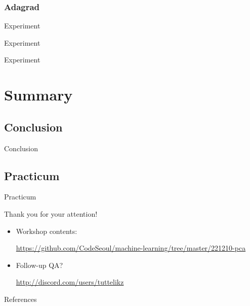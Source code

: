 \documentclass{beamer}
\begin{document}
    \begin{frame}
    \end{frame}



    \begin{frame}
      \begin{center}
      \end{center}
    \end{frame}


    \begin{frame}
      \frametitle{Adagrad}
    \end{frame}


    \nocite{*}
    \begin{frame}{Experiment}
    \end{frame}

    \begin{frame}{Experiment}
    \end{frame}

    \begin{frame}{Experiment}
    \end{frame}
    

    \section{Summary} %
    \subsection{Conclusion}
    \begin{frame}{Conclusion}

    \end{frame}


    \subsection{Practicum}
    \begin{frame}{Practicum}
      \begin{center}
      \begin{huge}Thank you for your attention!\end{huge}
      \end{center}

        \vspace{0.5cm}
        \begin{itemize}
          \item Workshop contents: \\
            \begin{small}\url{https://github.com/CodeSeoul/machine-learning/tree/master/221210-pca}
            \end{small}
          \item Follow-up QA? \\ 
            \begin{small}\url{http://discord.com/users/tuttelikz}
            \end{small}
        \end{itemize}

    \end{frame}

    \begin{frame}{References}
      \printbibliography  
    \end{frame}
\end{document}
